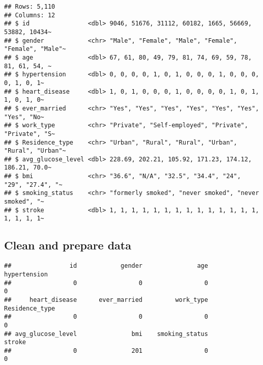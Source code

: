 \documentclass[
]{article}
\newenvironment{Shaded}{\begin{snugshade}}{\end{snugshade}}
\newcommand{\CommentTok}[1]{\textcolor[rgb]{0.56,0.35,0.01}{\textit{#1}}}
\newcommand{\ConstantTok}[1]{\textcolor[rgb]{0.56,0.35,0.01}{#1}}
\newcommand{\FunctionTok}[1]{\textcolor[rgb]{0.13,0.29,0.53}{\textbf{#1}}}
\newcommand{\NormalTok}[1]{#1}
\newcommand{\OtherTok}[1]{\textcolor[rgb]{0.56,0.35,0.01}{#1}}
\newcommand{\SpecialCharTok}[1]{\textcolor[rgb]{0.81,0.36,0.00}{\textbf{#1}}}
\newcommand{\StringTok}[1]{\textcolor[rgb]{0.31,0.60,0.02}{#1}}
\begin{document}
\begin{verbatim}
## Rows: 5,110
## Columns: 12
## $ id                <dbl> 9046, 51676, 31112, 60182, 1665, 56669, 53882, 10434~
## $ gender            <chr> "Male", "Female", "Male", "Female", "Female", "Male"~
## $ age               <dbl> 67, 61, 80, 49, 79, 81, 74, 69, 59, 78, 81, 61, 54, ~
## $ hypertension      <dbl> 0, 0, 0, 0, 1, 0, 1, 0, 0, 0, 1, 0, 0, 0, 0, 1, 0, 1~
## $ heart_disease     <dbl> 1, 0, 1, 0, 0, 0, 1, 0, 0, 0, 0, 1, 0, 1, 1, 0, 1, 0~
## $ ever_married      <chr> "Yes", "Yes", "Yes", "Yes", "Yes", "Yes", "Yes", "No~
## $ work_type         <chr> "Private", "Self-employed", "Private", "Private", "S~
## $ Residence_type    <chr> "Urban", "Rural", "Rural", "Urban", "Rural", "Urban"~
## $ avg_glucose_level <dbl> 228.69, 202.21, 105.92, 171.23, 174.12, 186.21, 70.0~
## $ bmi               <chr> "36.6", "N/A", "32.5", "34.4", "24", "29", "27.4", "~
## $ smoking_status    <chr> "formerly smoked", "never smoked", "never smoked", "~
## $ stroke            <dbl> 1, 1, 1, 1, 1, 1, 1, 1, 1, 1, 1, 1, 1, 1, 1, 1, 1, 1~
\end{verbatim}

\subsection{Clean and prepare data}\label{clean-and-prepare-data}

\begin{Shaded}
\end{Shaded}

\begin{verbatim}
##                id            gender               age      hypertension 
##                 0                 0                 0                 0 
##     heart_disease      ever_married         work_type    Residence_type 
##                 0                 0                 0                 0 
## avg_glucose_level               bmi    smoking_status            stroke 
##                 0               201                 0                 0
\end{verbatim}
\end{document}
